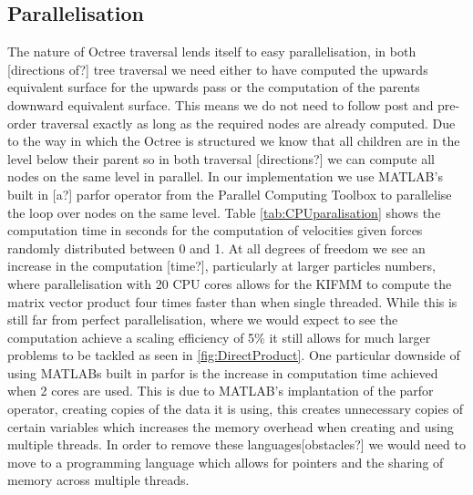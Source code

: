 \subsection{Parallelisation}
The nature of Octree traversal lends itself to easy parallelisation, in both [directions of?] tree traversal we need either to have computed the upwards equivalent surface for the upwards pass or the computation of the parents downward equivalent surface. This means we do not need to follow post and pre-order traversal exactly as long as the required nodes are already computed. Due to the way in which the Octree is structured we know that all children are in the level below their parent so in both traversal [directions?] we can compute all nodes on the same level in parallel. In our implementation we use MATLAB's built in [a?] parfor operator from the Parallel Computing Toolbox to parallelise the loop over nodes on the same level. Table \ref{tab:CPUparalisation} shows the computation time in seconds for the computation of velocities given forces randomly distributed between 0 and 1. At all degrees of freedom we see an increase in the computation [time?], particularly at larger particles numbers, where parallelisation with 20 CPU cores allows for the KIFMM to compute the matrix vector product four times faster than when single threaded. While this is still far from perfect parallelisation, where we would expect to see the computation achieve a scaling efficiency of 5\% it still allows for much larger problems to be tackled as seen in \cref{fig:DirectProduct}. One particular downside of using MATLABs built in parfor is the increase in computation time achieved when 2 cores are used. This is due to MATLAB's implantation of the parfor operator, creating copies of the data it is using, this creates unnecessary copies of certain variables which increases the memory overhead when creating and using multiple threads. In order to remove these languages[obstacles?] we would need to move to a programming language which allows for pointers and the sharing of memory across multiple threads.

